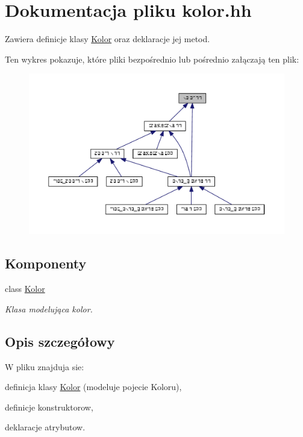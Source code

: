 \hypertarget{kolor_8hh}{}\section{Dokumentacja pliku kolor.\+hh}
\label{kolor_8hh}


Zawiera definicje klasy \hyperlink{class_kolor}{Kolor} oraz deklaracje jej metod.  


Ten wykres pokazuje, które pliki bezpośrednio lub pośrednio załączają ten plik\+:\nopagebreak
\begin{figure}[H]
\begin{center}
\leavevmode
\includegraphics[width=350pt]{kolor_8hh__dep__incl}
\end{center}
\end{figure}
\subsection*{Komponenty}
\begin{DoxyCompactItemize}
\item 
class \hyperlink{class_kolor}{Kolor}
\begin{DoxyCompactList}\small\item\em Klasa modelująca kolor. \end{DoxyCompactList}\end{DoxyCompactItemize}


\subsection{Opis szczegółowy}
W pliku znajduja sie\+:
\begin{DoxyItemize}
\item definicja klasy \hyperlink{class_kolor}{Kolor} (modeluje pojecie Koloru),
\item definicje konstruktorow,
\item deklaracje atrybutow. 
\end{DoxyItemize}